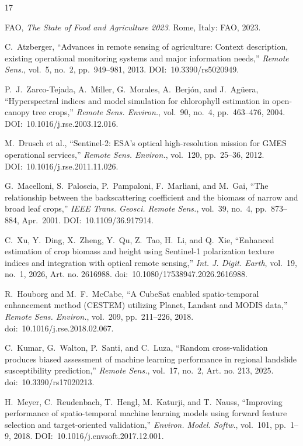 \documentclass[lettersize,journal]{IEEEtran}
\begin{document}
\begin{thebibliography}{17}


FAO, \textit{The State of Food and Agriculture 2023}. Rome, Italy: FAO, 2023.

C.~Atzberger, ``Advances in remote sensing of agriculture: Context
description, existing operational monitoring systems and major information
needs,'' \textit{Remote Sens.}, vol.~5, no.~2, pp.~949--981, 2013.
DOI:~10.3390/rs5020949.

P.~J.~Zarco-Tejada, A.~Miller, G.~Morales, A.~Berjón, and J.~Agüera,
``Hyperspectral indices and model simulation for chlorophyll estimation in
open-canopy tree crops,'' \textit{Remote Sens. Environ.}, vol.~90, no.~4,
pp.~463--476, 2004. DOI:~10.1016/j.rse.2003.12.016.

M.~Drusch et al., ``Sentinel-2: ESA's optical high-resolution mission for
GMES operational services,'' \textit{Remote Sens. Environ.}, vol.~120,
pp.~25--36, 2012. DOI:~10.1016/j.rse.2011.11.026.

G.~Macelloni, S.~Paloscia, P.~Pampaloni, F.~Marliani, and M.~Gai,
``The relationship between the backscattering coefficient and the biomass of
narrow and broad leaf crops,'' \textit{IEEE Trans. Geosci. Remote Sens.},
vol.~39, no.~4, pp.~873--884, Apr.~2001. DOI:~10.1109/36.917914.

C.~Xu, Y.~Ding, X.~Zheng, Y.~Qu, Z.~Tao, H.~Li, and Q.~Xie,
``Enhanced estimation of crop biomass and height using {Sentinel-1}
polarization texture indices and integration with optical remote sensing,''
\textit{Int. J. Digit. Earth}, vol.~19, no.~1, 2026, Art. no. 2616988.
doi:~10.1080/17538947.2026.2616988.

R.~Houborg and M.~F.~McCabe,
``A {CubeSat} enabled spatio-temporal enhancement method ({CESTEM})
utilizing {Planet}, {Landsat} and {MODIS} data,''
\textit{Remote Sens. Environ.}, vol.~209, pp.~211--226, 2018.
doi:~10.1016/j.rse.2018.02.067.

C.~Kumar, G.~Walton, P.~Santi, and C.~Luza,
``Random cross-validation produces biased assessment of machine learning
performance in regional landslide susceptibility prediction,''
\textit{Remote Sens.}, vol.~17, no.~2, Art. no. 213, 2025.
doi:~10.3390/rs17020213.

H.~Meyer, C.~Reudenbach, T.~Hengl, M.~Katurji, and T.~Nauss,
``Improving performance of spatio-temporal machine learning models using
forward feature selection and target-oriented validation,''
\textit{Environ. Model. Softw.}, vol.~101, pp.~1--9, 2018.
DOI:~10.1016/j.envsoft.2017.12.001.


\end{thebibliography}
\end{document}
